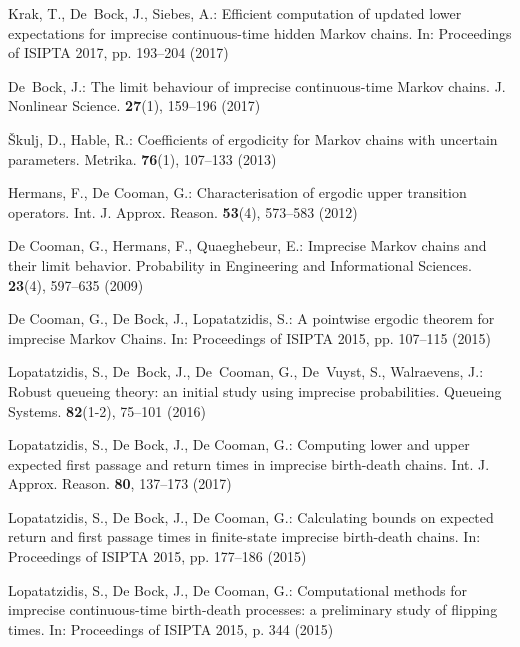 \begin{thebibliography}{99.}
Krak, T., De~Bock, J., Siebes, A.: {Efficient computation of updated lower expectations for imprecise continuous-time hidden {M}arkov chains}. In: Proceedings of ISIPTA 2017, pp. 193--204 (2017)


De~Bock, J.: {The limit behaviour of imprecise continuous-time Markov chains}. J. Nonlinear Science. \textbf{27}(1), 159--196 (2017)

{\v{S}}kulj, D., Hable, R.: {Coefficients of ergodicity for Markov chains with uncertain parameters}. Metrika. \textbf{76}(1), 107--133 (2013)

Hermans, F., De Cooman, G.: {Characterisation of ergodic upper transition operators}. Int. J. Approx. Reason. \textbf{53}(4), 573--583 (2012)

De Cooman, G., Hermans, F., Quaeghebeur, E.: {Imprecise Markov chains and their limit behavior}. Probability in Engineering and Informational Sciences. \textbf{23}(4), 597--635 (2009)

De Cooman, G., De Bock, J., Lopatatzidis, S.: {A pointwise ergodic theorem for imprecise Markov Chains}. In: Proceedings of ISIPTA 2015, pp. 107--115 (2015) 


Lopatatzidis, S., De~Bock, J., De~Cooman, G., De~Vuyst, S., Walraevens, J.: {Robust queueing theory: an initial study using imprecise probabilities}. Queueing Systems. \textbf{82}(1-2), 75--101 (2016)

Lopatatzidis, S., De Bock, J., De Cooman, G.: {Computing lower and upper expected first passage and return times in imprecise birth-death chains}. Int. J. Approx. Reason. \textbf{80}, 137--173 (2017) 

Lopatatzidis, S., De Bock, J., De Cooman, G.: {Calculating bounds on expected return and first passage times in finite-state imprecise birth-death chains}. In: Proceedings of ISIPTA 2015, pp. 177--186 (2015)

Lopatatzidis, S., De Bock, J., De Cooman, G.: {Computational methods for imprecise continuous-time birth-death processes: a preliminary study of flipping times}. In: Proceedings of ISIPTA 2015, p. 344 (2015)


\end{thebibliography}
